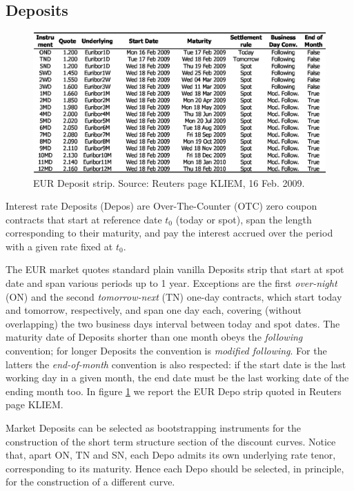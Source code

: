 \documentclass[11pt,reqno]{amsart}
\begin{document}
\subsection{Deposits}
\label{sec:Depo}
\begin{figure}[tp]
\centering
\includegraphics[scale=0.8]{../figures/FigMktDepos}
\caption{EUR Deposit strip. Source: Reuters page KLIEM, 16 Feb. 2009.}
\label{fig:Deposits}
\end{figure}
Interest rate Deposits (Depos) are Over-The-Counter (OTC) zero coupon contracts that start at reference date $t_0$ (today or spot), span the length corresponding to their maturity, and pay the interest accrued over the period with a given rate fixed at $t_0$.
\par
The EUR market quotes standard plain vanilla Deposits strip that start at spot date and span various periods up to 1 year.
Exceptions are the first {\it over-night} (ON) and the second {\it tomorrow-next} (TN) one-day contracts, which start today and tomorrow, respectively, and span one day each, covering (without overlapping) the two business days interval between today and spot dates.
The maturity date of Deposits shorter than one month obeys the {\it following} convention; for longer Deposits the convention is {\it modified following}. For the latters the {\it end-of-month} convention is also respected: if the start date is the last working day in a given month, the end date must be the last working date of the ending month too.
In figure \ref{fig:Deposits} we report the EUR Depo strip quoted in Reuters page KLIEM.
\par
Market Deposits can be selected as bootstrapping instruments for the construction of the short term structure section of the discount curves. Notice that, apart ON, TN and SN, each Depo admits its own underlying rate tenor, corresponding to its maturity. Hence each Depo should be selected, in principle, for the construction of a different curve.
\end{document}
